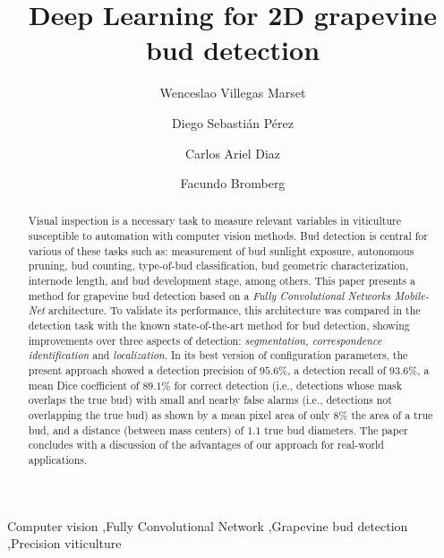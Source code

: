 \documentclass[a4paper,authoryear,review]{elsarticle}
\begin{document}
	
	\begin{frontmatter}
		
		\title{Deep Learning for 2D grapevine bud detection}
		
		\author[utn]{Wenceslao Villegas Marset}
		
		\author[utn]{Diego Sebastián Pérez}
		
		\author[utn]{Carlos Ariel Diaz}
		
		\author[utn,conicet]{Facundo Bromberg}
		
		\address[utn]{Universidad Tecnológica Nacional, Facultad Regional Mendoza, Grupo de Inteligencia Artificial DHARMa, Dpto. de Sistemas de la Información. Rodríguez 273, CP 5500, Mendoza, Argentina.}
		
		\address[conicet]{Consejo Nacional de Investigaciones Científicas y Técnicas (CONICET).}
		
		
		\begin{abstract}
			Visual inspection is a necessary task to measure relevant variables in viticulture susceptible to automation with computer vision methods. Bud detection is central for various of these tasks such as: measurement of bud sunlight exposure, autonomous pruning, bud counting, type-of-bud classification, bud geometric characterization, internode length, and bud development stage, among others. This paper presents a method for grapevine bud detection based on a \emph{Fully Convolutional Networks Mobile-Net} architecture. To validate its performance, this architecture was compared in the detection task with the known state-of-the-art method for bud detection, showing improvements over three aspects of detection: \emph{segmentation, correspondence identification} and \emph{localization}. In its best version of configuration parameters, the present approach showed a detection precision of $95.6\%$, a detection recall of $93.6\%$, a mean Dice coefficient of $89.1\%$ for correct detection (i.e., detections whose mask overlaps the true bud) with small and nearby false alarms (i.e., detections not overlapping the true bud) as shown by a mean pixel area of only $8\%$ the area of a true bud,  and a distance (between mass centers) of $1.1$ true bud diameters. The paper concludes with a discussion of the  advantages of our approach for real-world applications.
		\end{abstract}
		
		\begin{keyword}
			Computer vision \sep Fully Convolutional Network \sep Grapevine bud detection \sep Precision viticulture
		\end{keyword}
	\end{frontmatter}
	
\end{document}
